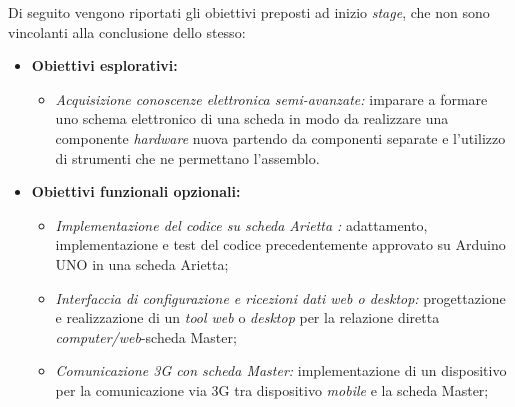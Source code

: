 Di seguito vengono riportati gli obiettivi preposti ad inizio \textit{stage}, che non sono vincolanti alla conclusione dello stesso:
\begin{itemize}
		\item \textbf{Obiettivi esplorativi:} 
		\begin{itemize}
			\item \textit{Acquisizione conoscenze elettronica semi-avanzate:} imparare a formare uno schema elettronico di una scheda in modo da realizzare una componente \textit{hardware} nuova partendo da componenti separate e l'utilizzo di strumenti che ne permettano l'assemblo.
		\end{itemize}

		\item \textbf{Obiettivi funzionali opzionali:}
		\begin{itemize}
			\item \textit{Implementazione del codice su scheda Arietta :} adattamento, implementazione e test del codice precedentemente approvato su Arduino UNO in una scheda Arietta;
			\item \textit{Interfaccia di configurazione e ricezioni dati web o desktop:} progettazione e realizzazione di un \textit{tool web} o \textit{desktop} per la relazione diretta \textit{computer/web}-scheda Master;
			\item \textit{Comunicazione 3G con scheda Master:} implementazione di un dispositivo per la comunicazione via 3G tra dispositivo \textit{mobile} e la scheda Master;
		\end{itemize}

\end{itemize}
